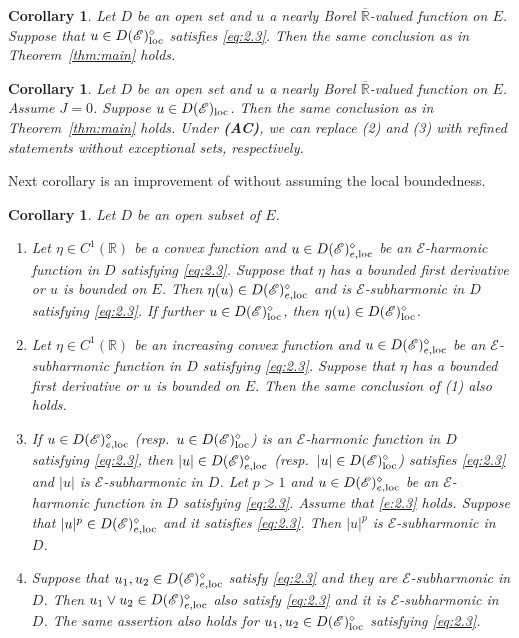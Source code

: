 \documentclass[12pt,a4paper]{article}
\newtheorem{cor}[thm]{Corollary}
\newcommand{\R}{\mathbb{R}}
\newcommand{\loc}{{\rm loc}}
\newcommand{\1}{{\bf 1}}
\begin{document}
\begin{cor}\label{cor:main0}
Let $D$ be an open set and $u$ a nearly Borel $\overline{\R}$-valued function on $E$. 
Suppose that $u\in D(\mathscr{E})_{\loc}^{\diamond}$ satisfies \eqref{eq:2.3}. Then the same conclusion 
as in Theorem~\ref{thm:main} holds.
\end{cor}
\begin{cor}\label{cor:main}
Let $D$ be an open set and $u$ a nearly Borel $\overline{\R}$-valued function on $E$. 
Assume $J=0$. 
Suppose $u\in D(\mathscr{E})_{\loc}$. 
Then the same conclusion as in Theorem~\ref{thm:main} holds.
Under {\bf (AC)}, we can replace {\rm(2)} and {\rm(3)}
with refined statements without exceptional sets, respectively.
\end{cor}

Next corollary is an improvement of \cite[Corollary~2.10]{CK} without assuming the local boundedness.
\begin{cor}\label{cor:lattice}
Let $D$ be an open subset of $E$. 
\begin{enumerate}
\item[\rm(1)] Let $\eta\in C^1(\R)$ be 
a convex function and $u\in D(\mathscr{E
})_{e,\loc}^{\diamond}$ be an $\mathscr{E}$-harmonic function in $D$ satisfying 
\eqref{eq:2.3}. Suppose that $\eta$ has a bounded first derivative or $u$ is bounded on $E$. Then $\eta(u)\in D(\mathscr{E})_{e,\loc}^{\diamond}$ and is $\mathscr{E}$-subharmonic in $D$ satisfying \eqref{eq:2.3}. If further $u\in D(\mathscr{E
})_{\loc}^{\diamond}$, then $\eta(u)\in D(\mathscr{E})_{\loc}^{\diamond}$.  
\item[\rm(2)] Let $\eta\in C^1(\R)$ be 
an increasing convex function and $u\in D(\mathscr{E
})_{e,\loc}^{\diamond}$ be an $\mathscr{E}$-subharmonic function in $D$ satisfying \eqref{eq:2.3}. Suppose that $\eta$ has a bounded first derivative or $u$ is bounded on $E$. Then the same conclusion of {\rm(1)} also holds.  
\item[\rm(3)] If $u\in D(\mathscr{E})_{e,\loc}^{\diamond}$ {\rm(}resp.~$u\in D(\mathscr{E})_{\loc}^{\diamond}${\rm)} is an $\mathscr{E}$-harmonic function in $D$ satisfying \eqref{eq:2.3}, then  
$|u|\in  D(\mathscr{E})_{e,\loc}^{\diamond}$ {\rm(}resp.~$|u|\in D(\mathscr{E})_{\loc}^{\diamond}${\rm)} 
satisfies \eqref{eq:2.3} and $|u|$ is $\mathscr{E}$-subharmonic in $D$. 
Let $p>1$ and $u\in D(\mathscr{E})_{e,\loc}^{\diamond}$ be an $\mathscr{E}$-harmonic function in $D$ satisfying \eqref{eq:2.3}.  
Assume that \eqref{e:2.3} holds.
Suppose that $|u|^p\in  D(\mathscr{E})_{e,\loc}^{\diamond}$ and it  
satisfies \eqref{eq:2.3}. 
Then $|u|^p$ is $\mathscr{E}$-subharmonic in $D$.
\item[\rm(4)]
Suppose that $u_1,u_2\in D(\mathscr{E})^{\diamond}_{e,\loc}$ satisfy 
\eqref{eq:2.3} and they are $\mathscr{E}$-subharmonic in $D$. 
Then $u_1\lor u_2\in D(\mathscr{E})^{\diamond}_{e,\loc}$ also satisfy \eqref{eq:2.3} and it is $\mathscr{E}$-subharmonic in $D$. 
The same assertion also holds for $u_1,u_2\in D(\mathscr{E})^{\diamond}_{\loc}$ satisfying \eqref{eq:2.3}. 
\end{enumerate}
\end{cor}
\end{document}
